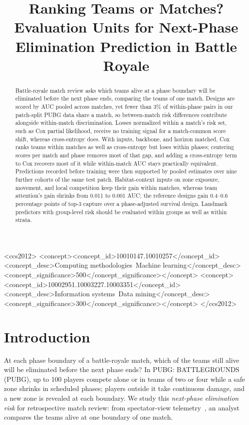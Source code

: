 \documentclass[sigconf,anonymous,nonacm]{acmart}
\begin{document}
\title[Evaluation Units for Next-Phase Elimination Prediction]{Ranking Teams or Matches? Evaluation Units for Next-Phase Elimination Prediction in Battle Royale}
\begin{abstract}
Battle-royale match review asks which teams alive at a phase boundary will be eliminated before the next phase ends, comparing the teams of one match. Designs are scored by AUC pooled across matches, yet fewer than 3\% of within-phase pairs in our patch-split PUBG data share a match, so between-match risk differences contribute alongside within-match discrimination. Losses normalized within a match's risk set, such as Cox partial likelihood, receive no training signal for a match-common score shift, whereas cross-entropy does. With inputs, backbone, and horizon matched, Cox ranks teams within matches as well as cross-entropy but loses within phases; centering scores per match and phase removes most of that gap, and adding a cross-entropy term to Cox recovers most of it while within-match AUC stays practically equivalent. Predictions recorded before training were then supported by pooled estimates over nine further cohorts of the same test patch. Habitat-context inputs on zone exposure, movement, and local competition keep their gain within matches, whereas team attention's gain shrinks from 0.011 to 0.001 AUC; the reference designs gain 0.4--0.6 percentage points of top-3 capture over a phase-adjusted survival design. Landmark predictors with group-level risk should be evaluated within groups as well as within strata.
\end{abstract}
\begin{CCSXML}
<ccs2012>
<concept><concept_id>10010147.10010257</concept_id><concept_desc>Computing methodologies~Machine learning</concept_desc><concept_significance>500</concept_significance></concept>
<concept><concept_id>10002951.10003227.10003351</concept_id><concept_desc>Information systems~Data mining</concept_desc><concept_significance>300</concept_significance></concept>
</ccs2012>
\end{CCSXML}
\maketitle
\section{Introduction}
\label{sec:introduction}
At each phase boundary of a battle-royale match, which of the teams still alive will be eliminated before the next phase ends? In PUBG: BATTLEGROUNDS (PUBG), up to 100 players compete alone or in teams of two or four while a safe zone shrinks in scheduled phases; players outside it take continuous damage, and a new zone is revealed at each boundary. We study this \emph{next-phase elimination risk} for retrospective match review: from spectator-view telemetry~\cite{PUBGAPI}, an analyst compares the teams alive at one boundary of one match.
\end{document}
